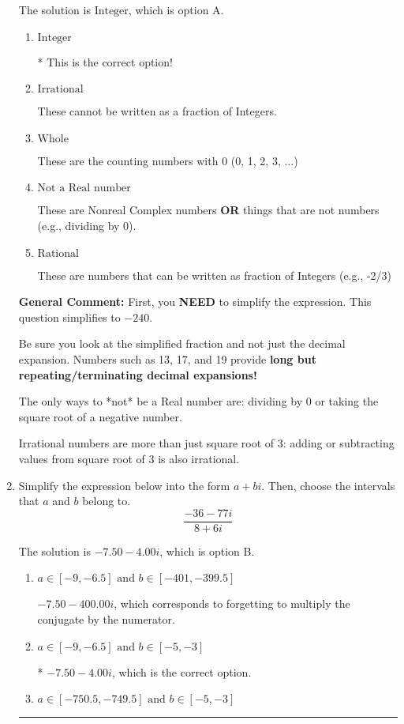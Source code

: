 \documentclass{extbook}[14pt]
\newcommand{\litem}[1]{\item #1

\rule{\textwidth}{0.4pt}}
\begin{document}
\begin{enumerate}
{The solution is \( \text{Integer} \), which is option A.\begin{enumerate}[label=\Alph*.]
\item \( \text{Integer} \)

* This is the correct option!
\item \( \text{Irrational} \)

These cannot be written as a fraction of Integers.
\item \( \text{Whole} \)

These are the counting numbers with 0 (0, 1, 2, 3, ...)
\item \( \text{Not a Real number} \)

These are Nonreal Complex numbers \textbf{OR} things that are not numbers (e.g., dividing by 0).
\item \( \text{Rational} \)

These are numbers that can be written as fraction of Integers (e.g., -2/3)
\end{enumerate}

\textbf{General Comment:} First, you \textbf{NEED} to simplify the expression. This question simplifies to $-240$. 
 
 Be sure you look at the simplified fraction and not just the decimal expansion. Numbers such as 13, 17, and 19 provide \textbf{long but repeating/terminating decimal expansions!} 
 
 The only ways to *not* be a Real number are: dividing by 0 or taking the square root of a negative number. 
 
 Irrational numbers are more than just square root of 3: adding or subtracting values from square root of 3 is also irrational.
}
\litem{
Simplify the expression below into the form $a+bi$. Then, choose the intervals that $a$ and $b$ belong to.
\[ \frac{-36 - 77 i}{8 + 6 i} \]

The solution is \( -7.50  - 4.00 i \), which is option B.\begin{enumerate}[label=\Alph*.]
\item \( a \in [-9, -6.5] \text{ and } b \in [-401, -399.5] \)

 $-7.50  - 400.00 i$, which corresponds to forgetting to multiply the conjugate by the numerator.
\item \( a \in [-9, -6.5] \text{ and } b \in [-5, -3] \)

* $-7.50  - 4.00 i$, which is the correct option.
\item \( a \in [-750.5, -749.5] \text{ and } b \in [-5, -3] \)


\end{enumerate}}
\end{enumerate}
\end{document}
